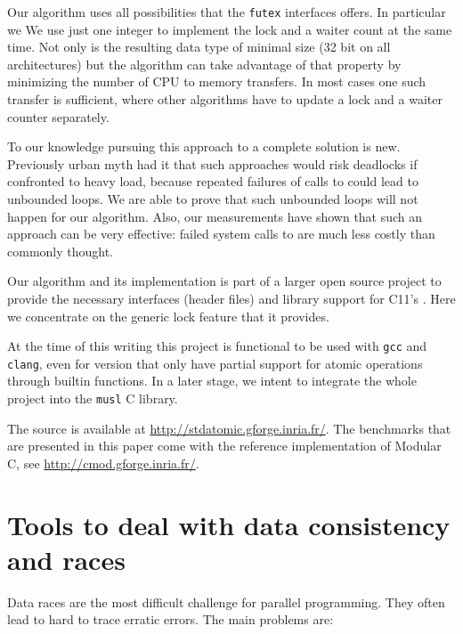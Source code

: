 \iflong%
Our algorithm uses all possibilities that the \texttt{futex} interfaces
offers. In particular we
\else%
We
\fi%
use just one  integer to
implement the lock and a waiter count at the same time. Not only is
the resulting data type of minimal size (32 bit on all
architectures) but the algorithm can take advantage of that property
by minimizing the number of CPU to memory transfers. In most cases
one such transfer is sufficient, where other algorithms have to
update a lock and a waiter counter separately.

To our knowledge pursuing this approach to a complete solution is
new. Previously urban myth had it that such approaches would risk
deadlocks if confronted to heavy load, because repeated failures of
calls to  could lead to unbounded loops. We are able to
prove that such unbounded loops will not happen for our algorithm.
Also, our measurements have shown that such an approach can be very
effective: failed system calls to  are much less costly
than commonly thought.

Our algorithm and its implementation is part of a larger open
source project to provide the necessary interfaces (header files)
and library support for C11's . Here we concentrate on
the generic lock feature that it provides.

At the time of this writing this project is functional to be used with
\texttt{gcc} and \texttt{clang}, even for version that only have partial
support for atomic operations through builtin functions.  In a later stage,
we intent to integrate the whole project into the \texttt{musl} C library.

The source is available at \url{http://stdatomic.gforge.inria.fr/}. The
benchmarks that are presented in this paper come with the reference
implementation of Modular C, see \url{http://cmod.gforge.inria.fr/}.
\clearpage

\section{Tools to deal with data consistency and races}
\label{sec-2}

Data races are the most difficult challenge for parallel
programming. They often lead to hard to trace erratic errors.
\iflong
The main problems are:\itemadjust

